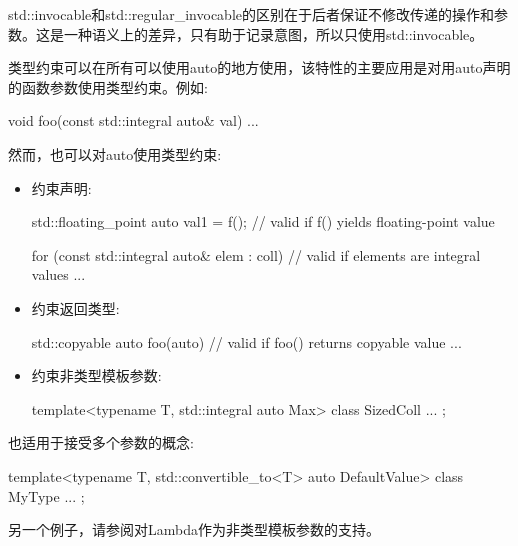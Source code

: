std::invocable和std::regular\_invocable的区别在于后者保证不修改传递的操作和参数。这是一种语义上的差异，只有助于记录意图，所以只使用std::invocable。


类型约束可以在所有可以使用auto的地方使用，该特性的主要应用是对用auto声明的函数参数使用类型约束。例如:

\begin{cpp}
void foo(const std::integral auto& val)
{
	...
}
\end{cpp}

然而，也可以对auto使用类型约束:

\begin{itemize}
\item
约束声明:

\begin{cpp}
std::floating_point auto val1 = f(); // valid if f() yields floating-point value

for (const std::integral auto& elem : coll) { // valid if elements are integral values
	...
}
\end{cpp}

\item
约束返回类型:

\begin{cpp}
std::copyable auto foo(auto) { // valid if foo() returns copyable value
	...
}
\end{cpp}

\item
约束非类型模板参数:

\begin{cpp}
template<typename T, std::integral auto Max>
class SizedColl {
	...
};
\end{cpp}
\end{itemize}

也适用于接受多个参数的概念:

\begin{cpp}
template<typename T, std::convertible_to<T> auto DefaultValue>
class MyType {
	...
};
\end{cpp}

另一个例子，请参阅对Lambda作为非类型模板参数的支持。












